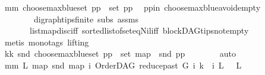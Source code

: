 \begin{isabellebody}
\ mm{\isacharcolon}{\kern0pt}\ {\isachardoublequoteopen}choose{\isacharunderscore}{\kern0pt}max{\isacharunderscore}{\kern0pt}blue{\isacharunderscore}{\kern0pt}set\ pp\ {\isasymin}\ set\ pp{\isachardoublequoteclose}\ \isamarkupfalse%
\ pp{\isacharunderscore}{\kern0pt}in\ choose{\isacharunderscore}{\kern0pt}max{\isacharunderscore}{\kern0pt}blue{\isacharunderscore}{\kern0pt}avoid{\isacharunderscore}{\kern0pt}empty\isanewline
\ \ \ \ \ \ \ \ digraph{\isachardot}{\kern0pt}tips{\isacharunderscore}{\kern0pt}finite\ subs\ assms{\isacharparenleft}{\kern0pt}{}{\isacharparenright}{\kern0pt}\isanewline
\ \ \ \ \ \ \ list{\isachardot}{\kern0pt}map{\isacharunderscore}{\kern0pt}disc{\isacharunderscore}{\kern0pt}iff\ sorted{\isacharunderscore}{\kern0pt}list{\isacharunderscore}{\kern0pt}of{\isacharunderscore}{\kern0pt}set{\isacharunderscore}{\kern0pt}eq{\isacharunderscore}{\kern0pt}Nil{\isacharunderscore}{\kern0pt}iff\ blockDAG{\isachardot}{\kern0pt}tips{\isacharunderscore}{\kern0pt}not{\isacharunderscore}{\kern0pt}empty\ \isanewline
\ \ \ \ \ \ \isamarkupfalse%
\ {\isacharparenleft}{\kern0pt}metis\ {\isacharparenleft}{\kern0pt}mono{\isacharunderscore}{\kern0pt}tags{\isacharcomma}{\kern0pt}\ lifting{\isacharparenright}{\kern0pt}{\isacharparenright}{\kern0pt}\ \ \isanewline
\ \ \ \ \isamarkupfalse%
\ \isamarkupfalse%
\ kk{\isacharcolon}{\kern0pt}\ {\isachardoublequoteopen}snd\ {\isacharparenleft}{\kern0pt}choose{\isacharunderscore}{\kern0pt}max{\isacharunderscore}{\kern0pt}blue{\isacharunderscore}{\kern0pt}set\ pp{\isacharparenright}{\kern0pt}\ {\isasymin}\ set\ {\isacharparenleft}{\kern0pt}map\ \ snd\ pp{\isacharparenright}{\kern0pt}{\isachardoublequoteclose}\isanewline
\ \ \ \ \ \ \isamarkupfalse%
\ auto\ \isanewline
\ \ \ \ \isamarkupfalse%
\ mm{}{\isacharcolon}{\kern0pt}\ {\isachardoublequoteopen}{\isasymAnd}L{\isachardot}{\kern0pt}\ {\isacharparenleft}{\kern0pt}map\ snd\ {\isacharparenleft}{\kern0pt}map\ {\isacharparenleft}{\kern0pt}{\isasymlambda}i{\isachardot}{\kern0pt}\ {\isacharparenleft}{\kern0pt}{\isacharparenleft}{\kern0pt}OrderDAG\ {\isacharparenleft}{\kern0pt}reduce{\isacharunderscore}{\kern0pt}past\ G\ i{\isacharparenright}{\kern0pt}\ k{\isacharparenright}{\kern0pt}\ {\isacharcomma}{\kern0pt}\ i{\isacharparenright}{\kern0pt}{\isacharparenright}{\kern0pt}\ L{\isacharparenright}{\kern0pt}{\isacharparenright}{\kern0pt}\ {\isacharequal}{\kern0pt}\ \ L{\isachardoublequoteclose}\ \isanewline
\ \ \ \ \isamarkupfalse%
\ {\isacharminus}{\kern0pt}\isanewline

\end{isabellebody}
